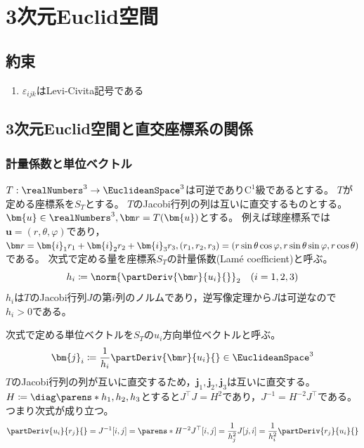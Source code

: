 \chapter{3次元Euclid空間}
    \section{約束}
        \begin{enumerate}
            \item $\varepsilon_{ijk}$はLevi-Civita記号である
        \end{enumerate}
    \section{3次元Euclid空間と直交座標系の関係}
        \subsection{計量係数と単位ベクトル}
            \label{計量係数と単位ベクトル}
            $T:\realNumbers^3\to\EuclideanSpace^3$は可逆であり$\mathrm{C}^1$級であるとする。
            $T$が定める座標系を$S_T$とする。
            $T$のJacobi行列の列は互いに直交するものとする。
            $\bm{u}\in\realNumbers^3,\vr = T(\bm{u})$とする。
            例えば球座標系では$\bm{u} = (r,\theta,\varphi)$であり，$\vr = \bm{i}_1 r_1 + \bm{i}_2 r_2 + \bm{i}_3 r_3,(r_1,r_2,r_3) = (r\sin\theta\cos\varphi,r\sin\theta\sin\varphi,r\cos\theta)$である。
            次式で定める量を座標系$S_T$の計量係数(Lam\'{e} coefficient)と呼ぶ。
            \[ h_i \coloneq \norm{\partDeriv{\vr}{u_i}{}}_2 \quad (i=1,2,3) \]
            $h_i$は$T$のJacobi行列$J$の第$i$列のノルムであり，逆写像定理から$J$は可逆なので$h_i > 0$である。
            \par
            次式で定める単位ベクトルを$S_T$の$u_i$方向単位ベクトルと呼ぶ。
            \[ \bm{j}_i \coloneq \frac{1}{h_i}\partDeriv{\vr}{u_i}{}\in\EuclideanSpace^3 \]
            $T$のJacobi行列の列が互いに直交するため，$\bm{j}_1,\bm{j}_2,\bm{j}_3$は互いに直交する。
            $H\coloneq\diag\parens*{h_1,h_2,h_3}$とすると$J^\top J = H^2$であり，$J^{-1} = H^{-2}J^\top$である。
            つまり次式が成り立つ。
            \begin{equation}
                \partDeriv{u_i}{r_j}{} = J^{-1}[i,j] = \parens*{H^{-2}J^\top}[i,j] = \frac{1}{h_j^2}J[j,i] = \frac{1}{h_i^2}\partDeriv{r_j}{u_i}{}
                \label{直交座標系の Jacobi 行列と逆行列の要素の関係}
            \end{equation}
